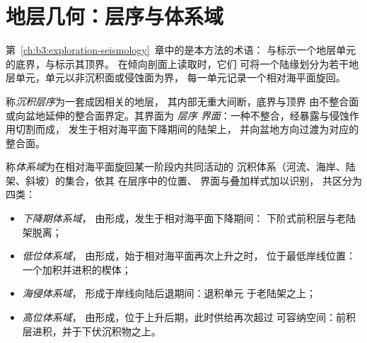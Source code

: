 \section{地层几何：层序与体系域}\label{sec:b3:sequence-stratigraphy:sequences}

第~\ref{ch:b3:exploration-seismology}~章中的是本方法的术语：
与标示一个地层单元的底界，与标示其顶界。
在倾向剖面上读取时，它们
可将一个陆缘划分为若干地层单元，单元以非沉积面或侵蚀面为界，
每一单元记录一个相对海平面旋回。

\begin{definition}[沉积层序与层序界面]\label{def:b3:sequence-stratigraphy:sequence}
称\emph{沉积层序}为一套成因相关的地层，
其内部无重大间断，底界与顶界
由不整合面或向盆地延伸的整合面界定。其界面为
\emph{层序
界面}：一种不整合，经暴露与侵蚀作用切割而成，
发生于相对海平面下降期间的陆架上，
并向盆地方向过渡为对应的整合面。
\end{definition}

\begin{definition}[体系域]\label{def:b3:sequence-stratigraphy:tract}
称\emph{体系域}为在相对海平面旋回某一阶段内共同活动的
沉积体系（河流、海岸、陆架、斜坡）的集合，依其
在层序中的位置、
界面与叠加样式加以识别，
共区分为四类：
\begin{itemize}
\item \emph{下降期体系域}，
  由形成，发生于相对海平面下降期间：
  下阶式前积层与老陆架脱离；
\item \emph{低位体系域}，
  由形成，始于相对海平面再次上升之时，
  位于最低岸线位置：一个加积并进积的楔体；
\item \emph{海侵体系域}，
  形成于岸线向陆后退期间：退积单元
  于老陆架之上；
\item \emph{高位体系域}，
  由形成，位于上升后期，此时供给再次超过
  可容纳空间：前积层进积，并于下伏沉积物之上。
\end{itemize}
\end{definition}

